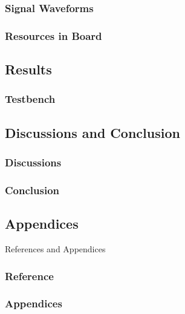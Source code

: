     \subsubsection{Signal Waveforms}
    \subsubsection{Resources in Board}

\subsection{Results}%
    \subsubsection{Testbench}

\subsection{Discussions and Conclusion}
    \subsubsection{Discussions}%
    \subsubsection{Conclusion}

\subsection{Appendices} References and Appendices
    \subsubsection{Reference}%
    \subsubsection{Appendices}%